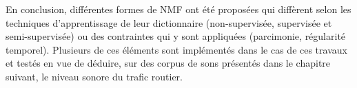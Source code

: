En conclusion, différentes formes de NMF ont été proposées qui diffèrent selon les techniques d'apprentissage de leur dictionnaire (non-supervisée, supervisée et semi-supervisée) ou des contraintes qui y sont appliquées (parcimonie, régularité temporel). Plusieurs de ces éléments sont implémentés dans le cas de ces travaux et testés en vue de déduire, sur des corpus de sons présentés dans le chapitre suivant, le niveau sonore du trafic routier.


%
%
%
%
%
%







